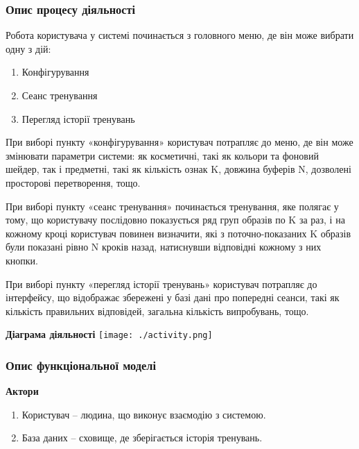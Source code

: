 \subsubsection{Опис процесу діяльності}

Робота користувача у системі починається з головного меню, де він може вибрати одну з дій:

\begin{enumerate}
  \item Конфігурування
  \item Сеанс тренування
  \item Перегляд історії тренувань
\end{enumerate}

При виборі пункту «конфігурування» користувач потрапляє до меню, де він може змінювати параметри системи: як косметичні, такі як кольори та фоновий шейдер, так і предметні, такі як кількість ознак K, довжина буферів N, дозволені просторові перетворення, тощо.

При виборі пункту «сеанс тренування» починається тренування, яке полягає у тому, що користувачу послідовно показується ряд груп образів по K за раз, і на кожному кроці користувач повинен визначити, які з поточно-показаних K образів були показані рівно N кроків назад, натиснувши відповідні кожному з них кнопки.

При виборі пункту «перегляд історії тренувань» користувач потрапляє до інтерфейсу, що відображає збережені у базі дані про попередні сеанси, такі як кількість правильних відповідей, загальна кількість випробувань, тощо.

\begin{center}
  \textbf{Діаграма діяльності}
  \texttt{[image: ./activity.png]}
\end{center}

\subsubsection{Опис функціональної моделі}

\begin{center}
  \textbf{Актори}
\end{center}

\begin{enumerate}
  \item Користувач – людина, що виконує взаємодію з системою.
  \item База даних – сховище, де зберігається історія тренувань.
\end{enumerate}

